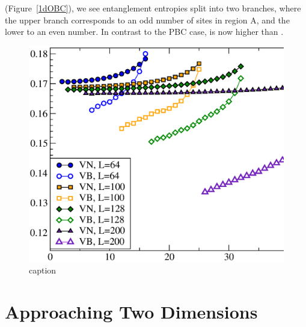  (Figure~\ref{1dOBC}), we see entanglement entropies split into two branches, where the upper branch corresponds to an odd number of sites in region A, and the lower to an even number.
In contrast to the PBC case, \vb is now higher than \vn.

\begin{figure} {
\includegraphics[width=6.5in]{./figures/paper1/figure1/fig2_NEW.eps} 
\centering
\caption[caption]{ 
	caption
}}
\end{figure}

\section{Approaching Two Dimensions}


